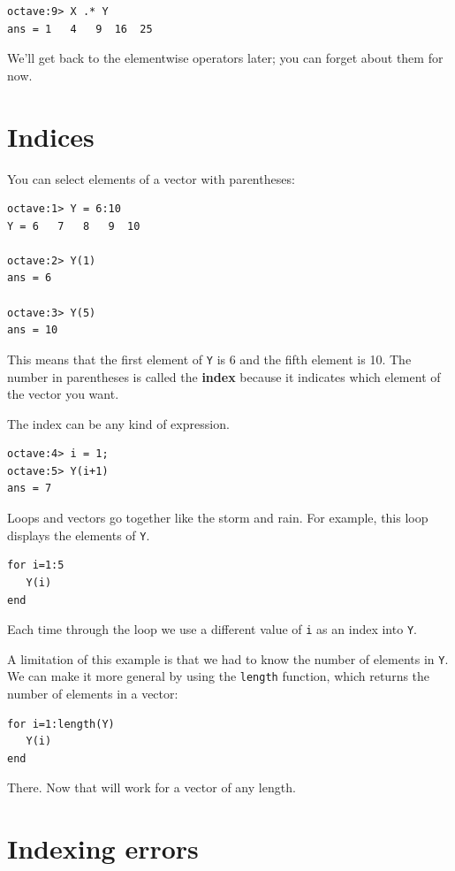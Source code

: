 \documentclass{book}
\begin{document}
\begin{verbatim}
octave:9> X .* Y
ans = 1   4   9  16  25
\end{verbatim}

We'll get back to the elementwise operators later; you can
forget about them for now.




\section{Indices}

You can select elements of a vector with parentheses:

\begin{verbatim}
octave:1> Y = 6:10
Y = 6   7   8   9  10

octave:2> Y(1)
ans = 6

octave:3> Y(5)
ans = 10
\end{verbatim}

This means that the first element of {\tt Y} is 6 and the
fifth element is 10. The number in parentheses is called
the {\bf index} because it indicates which element of the
vector you want.

The index can be any kind of expression.

\begin{verbatim}
octave:4> i = 1;
octave:5> Y(i+1)
ans = 7
\end{verbatim}

Loops and vectors go together like the storm and rain.
For example, this loop displays the elements of {\tt Y}.

\begin{verbatim}
for i=1:5
   Y(i)
end
\end{verbatim}

Each time through the loop we use a different value of {\tt i}
as an index into {\tt Y}.

A limitation of this example is that we had to know the number
of elements in {\tt Y}. We can make it more general by using
the {\tt length} function, which returns the number of elements
in a vector:

\begin{verbatim}
for i=1:length(Y)
   Y(i)
end
\end{verbatim}

There. Now that will work for a vector of any length.


\section{Indexing errors}
\end{document}
